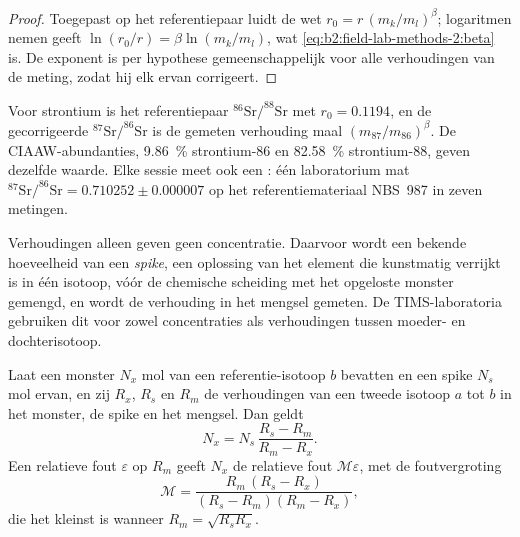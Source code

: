 \begin{proof}
Toegepast op het referentiepaar luidt de wet $r_0 = r\,(m_k/m_l)^\beta$; logaritmen nemen geeft
$\ln(r_0/r) = \beta\ln(m_k/m_l)$, wat \eqref{eq:b2:field-lab-methods-2:beta} is. De exponent is
per hypothese gemeenschappelijk voor alle verhoudingen van de meting, zodat hij elk ervan corrigeert.
\end{proof}

Voor strontium is het referentiepaar $^{86}\mathrm{Sr}/^{88}\mathrm{Sr}$ met $r_0 = 0.1194$, en
de gecorrigeerde $^{87}\mathrm{Sr}/^{86}\mathrm{Sr}$ is de gemeten verhouding maal
$(m_{87}/m_{86})^\beta$. De CIAAW-abundanties, \qty{9.86}{\percent} strontium-86 en
\qty{82.58}{\percent} strontium-88, geven dezelfde waarde. Elke sessie meet ook een : één laboratorium mat $^{87}\mathrm{Sr}/^{86}\mathrm{Sr} = 0.710252 \pm
0.000007$ op het referentiemateriaal NBS~987 in zeven metingen.

Verhoudingen alleen geven geen concentratie. Daarvoor wordt een bekende hoeveelheid van een \emph{spike}, een oplossing van
het element die kunstmatig verrijkt is in één isotoop, vóór de chemische scheiding met het opgeloste monster
gemengd, en wordt de verhouding in het mengsel gemeten. De TIMS-laboratoria gebruiken dit voor zowel
concentraties als verhoudingen tussen moeder- en dochterisotoop.

\begin{proposition}[Isotopenverdunning]\label{prop:b2:field-lab-methods-2:id}
Laat een monster $N_x$ mol van een referentie-isotoop $b$ bevatten en een spike $N_s$ mol ervan, en zij
$R_x$, $R_s$ en $R_m$ de verhoudingen van een tweede isotoop $a$ tot $b$ in het monster, de spike en
het mengsel. Dan geldt
\begin{equation}
N_x = N_s\,\frac{R_s - R_m}{R_m - R_x} .
\label{eq:b2:field-lab-methods-2:id}
\end{equation}
Een relatieve fout $\varepsilon$ op $R_m$ geeft $N_x$ de relatieve fout $\mathcal{M}\varepsilon$,
met de foutvergroting
\begin{equation}
\mathcal{M} = \frac{R_m\,(R_s - R_x)}{(R_s - R_m)(R_m - R_x)} ,
\label{eq:b2:field-lab-methods-2:mag}
\end{equation}
die het kleinst is wanneer $R_m = \sqrt{R_s R_x}$.
\end{proposition}

